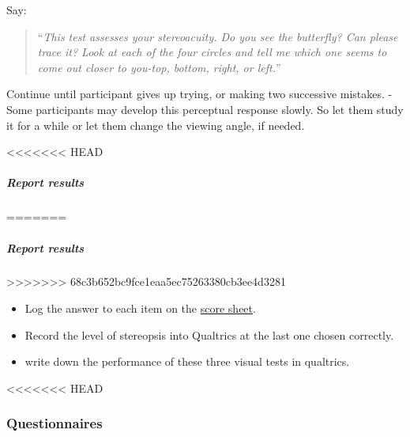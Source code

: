 \documentclass[]{article}
\let\oldsubparagraph\subparagraph
\renewcommand{\subparagraph}[1]{\oldsubparagraph{#1}\mbox{}}
\begin{document}
Say:

\begin{quote}
``\emph{This test assesses your stereoacuity. Do you see the butterfly?
Can please trace it? Look at each of the four circles and tell me which
one seems to come out closer to you-top, bottom, right, or left.}''
\end{quote}

Continue until participant gives up trying, or making two successive
mistakes. - Some participants may develop this perceptual response
slowly. So let them study it for a while or let them change the viewing
angle, if needed.

<<<<<<< HEAD
\subparagraph{Report results}\label{report-results-2}
=======
\hypertarget{report-results-2}{%
\subparagraph{Report results}\label{report-results-2}}
>>>>>>> 68c3b652bc9fce1eaa5ec75263380cb3ee4d3281

\begin{itemize}
\item
  Log the answer to each item on the
  \href{vision-screening-score-sheet.html}{score sheet}.
\item
  Record the level of stereopsis into Qualtrics at the last one chosen
  correctly.
\item
  write down the performance of these three visual tests in qualtrics.
\end{itemize}

<<<<<<< HEAD
\subsubsection{Questionnaires}\label{questionnaires}
\end{document}
